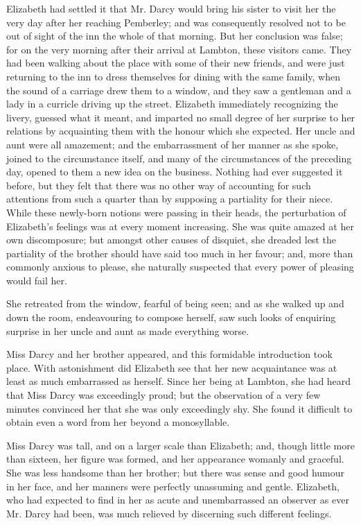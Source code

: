 Elizabeth had settled it that Mr. Darcy would bring his sister to visit her the very day after her reaching Pemberley; and was consequently resolved not to be out of sight of the inn the whole of that morning. But her conclusion was false; for on the very morning after their arrival at Lambton, these visitors came. They had been walking about the place with some of their new friends, and were just returning to the inn to dress themselves for dining with the same family, when the sound of a carriage drew them to a window, and they saw a gentleman and a lady in a curricle driving up the street. Elizabeth immediately recognizing the livery, guessed what it meant, and imparted no small degree of her surprise to her relations by acquainting them with the honour which she expected. Her uncle and aunt were all amazement; and the embarrassment of her manner as she spoke, joined to the circumstance itself, and many of the circumstances of the preceding day, opened to them a new idea on the business. Nothing had ever suggested it before, but they felt that there was no other way of accounting for such attentions from such a quarter than by supposing a partiality for their niece. While these newly-born notions were passing in their heads, the perturbation of Elizabeth's feelings was at every moment increasing. She was quite amazed at her own discomposure; but amongst other causes of disquiet, she dreaded lest the partiality of the brother should have said too much in her favour; and, more than commonly anxious to please, she naturally suspected that every power of pleasing would fail her.

She retreated from the window, fearful of being seen; and as she walked up and down the room, endeavouring to compose herself, saw such looks of enquiring surprise in her uncle and aunt as made everything worse.

Miss Darcy and her brother appeared, and this formidable introduction took place. With astonishment did Elizabeth see that her new acquaintance was at least as much embarrassed as herself. Since her being at Lambton, she had heard that Miss Darcy was exceedingly proud; but the observation of a very few minutes convinced her that she was only exceedingly shy. She found it difficult to obtain even a word from her beyond a monosyllable.

Miss Darcy was tall, and on a larger scale than Elizabeth; and, though little more than sixteen, her figure was formed, and her appearance womanly and graceful. She was less handsome than her brother; but there was sense and good humour in her face, and her manners were perfectly unassuming and gentle. Elizabeth, who had expected to find in her as acute and unembarrassed an observer as ever Mr. Darcy had been, was much relieved by discerning such different feelings.


